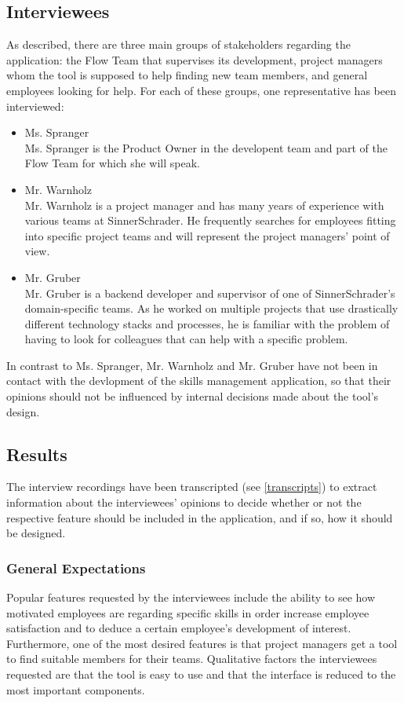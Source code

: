 \newpage

\subsection{Interviewees}
As described, there are three main groups of stakeholders regarding the application: the Flow Team that supervises its development, project managers whom the tool is supposed to help finding new team members, and general employees looking for help. For each of these groups, one representative has been interviewed:
\begin{itemize}
	\item Ms. Spranger\\
	Ms. Spranger is the Product Owner in the developent team and part of the Flow Team for which she will speak.
	\item Mr. Warnholz\\
	Mr. Warnholz is a project manager and has many years of experience with various teams at SinnerSchrader. He frequently searches for
	employees fitting into specific project teams and will represent the project managers' point of view.
	\item Mr. Gruber\\
	Mr. Gruber is a backend developer and supervisor of one of SinnerSchrader's domain-specific teams. As he worked on multiple projects that
	use drastically different technology stacks and processes, he is familiar with the problem of having to look for colleagues that can help with a specific problem.
\end{itemize}
In contrast to Ms. Spranger, Mr. Warnholz and Mr. Gruber have not been in contact with the devlopment of the skills management application, so that their opinions should not be influenced by internal decisions made about the tool's design.

\subsection{Results}
The interview recordings have been transcripted (see \ref{transcripts}) to extract information about the interviewees' opinions to decide whether or not the respective feature should be included in the application, and if so, how it should be designed.

\subsubsection{General Expectations}
Popular features requested by the interviewees include the ability to see how motivated employees are regarding specific skills in order increase employee satisfaction and to deduce a certain employee's development of interest. Furthermore, one of the most desired features is that project managers get a tool to find suitable members for their teams. Qualitative factors the interviewees requested are that the tool is easy to use and that the interface is reduced to the most important components.

